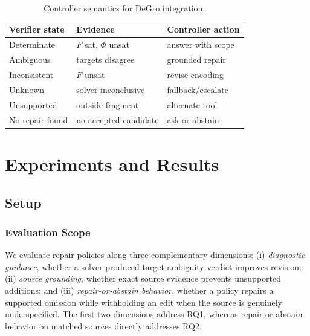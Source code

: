 \documentclass[sigconf,anonymous]{aamas}
\begin{document}
\begin{table}[t]
\centering
\caption{Controller semantics for DeGro integration.}
\label{tab:policy}
\small
\begin{tabular}{lll}
\toprule
Verifier state & Evidence & Controller action\\
\midrule
Determinate & $F$ sat, $\Phi$ unsat & answer with scope\\
Ambiguous & targets disagree & grounded repair\\
Inconsistent & $F$ unsat & revise encoding\\
Unknown & solver inconclusive & fallback/escalate\\
Unsupported & outside fragment & alternate tool\\
No repair found & no accepted candidate & ask or abstain\\
\bottomrule
\end{tabular}
\end{table}



\section{Experiments and Results}
\subsection{Setup}
\subsubsection{Evaluation Scope}
We evaluate repair policies along three complementary dimensions: (i) \emph{diagnostic guidance}, whether a solver-produced target-ambiguity verdict improves revision; (ii) \emph{source grounding}, whether exact source evidence prevents unsupported additions; and (iii) \emph{repair-or-abstain behavior}, whether a policy repairs a supported omission while withholding an edit when the source is genuinely underspecified. The first two dimensions address RQ1, whereas repair-or-abstain behavior on matched sources directly addresses RQ2.
\end{document}
